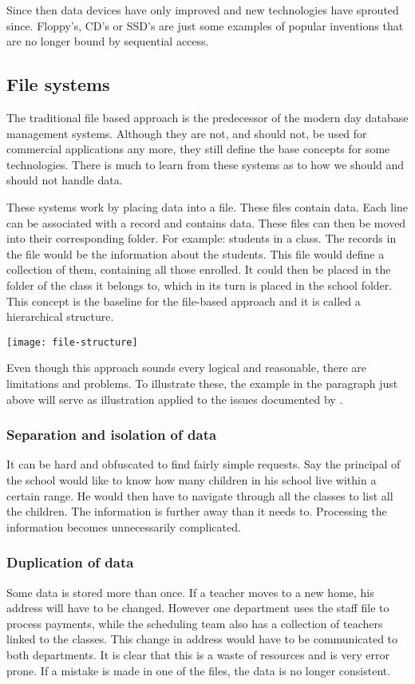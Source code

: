  Since then data devices have only improved and new technologies have sprouted since. Floppy's, CD's or SSD's are just some examples of popular inventions that are no longer bound by sequential access. 
 
\subsection{File systems}
The traditional file based approach is the predecessor of the modern day database management systems. Although they are not, and should not, be used for commercial applications any more, they still define the base concepts for some technologies. There is much to learn from these systems as to how we should and should not handle data.

These systems work by placing data into a file. These files contain data. Each line can be associated with a record and contains data. These files can then be moved into their corresponding folder. For example: students in a class. The records in the file would be the information about the students. This file would define a collection of them, containing all those enrolled. It could then be placed in the folder of the class it belongs to, which in its turn is placed in the school folder. This concept is the baseline for the file-based approach and it is called a hierarchical structure. 

	\begin{center}
		\texttt{[image: file-structure]} 
	\end{center}

Even though this approach sounds every logical and reasonable, there are limitations and problems. To illustrate these, the example in the paragraph just above will serve as illustration applied to the issues documented by \cite{dbhist1}.

\subsubsection{Separation and isolation of data}
It can be hard and obfuscated to find fairly simple requests. Say the principal of the school would like to know how many children in his school live within a certain range. He would then have to navigate through all the classes to list all the children. The information is further away than it needs to. Processing the information becomes unnecessarily complicated.

\subsubsection{Duplication of data}
Some data is stored more than once. If a teacher moves to a new home, his address will have to be changed. However one department uses the staff file to process payments, while the scheduling team also has a collection of teachers linked to the classes. This change in address would have to be communicated to both departments. It is clear that this is a waste of resources and is very error prone. If a mistake is made in one of the files, the data is no longer consistent.

